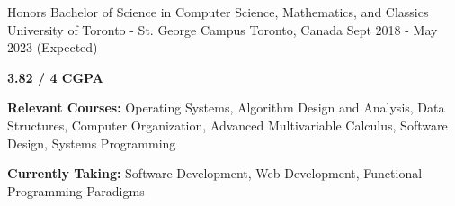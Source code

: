 

\begin{cventries}
  \cventry
  {Honors Bachelor of Science in Computer Science, Mathematics, and Classics} %
  {University of Toronto - St. George Campus} %
  {Toronto, Canada} %
  {Sept 2018 - May 2023 (Expected)} %
  {
    \begin{cvitems} %
      \item {\textbf{3.82 / 4 CGPA}}
      \item {\textbf{Relevant Courses:} Operating Systems, Algorithm Design and Analysis, Data Structures, Computer Organization, Advanced Multivariable Calculus, Software Design, Systems Programming}
      \item {\textbf{Currently Taking:} Software Development, Web Development, Functional Programming Paradigms}
    \end{cvitems}
  }

\end{cventries}
